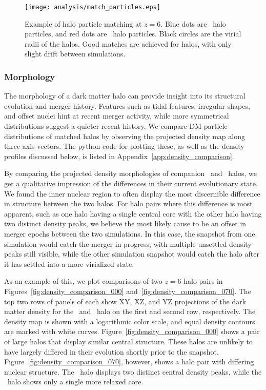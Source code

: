 \begin{figure}[t]
	\centering
	\texttt{[image: analysis/match\_particles.eps]}
	\caption[Example of halo particle matching at $z = 6$.]{\footnotesize Example of halo particle matching at $z = 6$.  Blue dots are \lpt\ halo particles, and red dots are \za\ halo particles.  Black circles are the virial radii of the halos.  Good matches are achieved for halos, with only slight drift between simulations.}
	\label{fig:match_verification}
\end{figure}



\subsubsection{Morphology}
\label{subsubsec:analysis--halo_comparison--morphology}


The morphology of a dark matter halo can provide insight into its structural evolution and merger history.  Features such as tidal features, irregular shapes, and offset nuclei hint at recent merger activity, while more symmetrical distributions suggest a quieter recent history.  We compare DM particle distributions of matched halos by observing the projected density map along three axis vectors.  The python code for plotting these, as well as the density profiles discussed below, is listed in Appendix~\ref{app:density_comparison}.

By comparing the projected density morphologies of companion \lpt\ and \za\ halos, we get a qualitative impression of the differences in their current evolutionary state.  We found the inner nuclear region to often display the most discernible difference in structure between the two halos.  For halo pairs where this difference is most apparent, such as one halo having a single central core with the other halo having two distinct density peaks, we believe the most likely cause to be an offset in merger epochs between the two simulations.  In this case, the snapshot from one simulation would catch the merger in progress, with multiple unsettled density peaks still visible, while the other simulation snapshot would catch the halo after it has settled into a more virialized state.

As an example of this, we plot comparisons of two $z = 6$ halo pairs in Figures~\ref{fig:density_comparison_000} and~\ref{fig:density_comparison_070}.  The top two rows of panels of each show XY, XZ, and YZ projections of the dark matter density for the \lpt\ and \za\ halo on the first and second row, respectively.  The density map is shown with a logarithmic color scale, and equal density contours are marked with white curves.  Figure~\ref{fig:density_comparison_000} shows a pair of large halos that display similar central structure.  These halos are unlikely to have largely differed in their evolution shortly prior to the snapshot.  Figure~\ref{fig:density_comparison_070}, however, shows a halo pair with differing nuclear structure.  The \za\ halo displays two distinct central density peaks, while the \lpt\ halo shows only a single more relaxed core.

